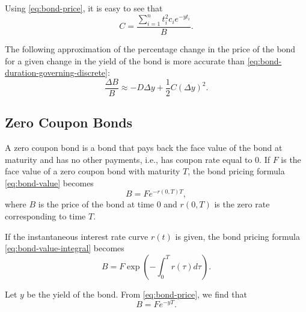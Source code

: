 Using \eqref{eq:bond-price}, it is easy to see that
\begin{equation*}
    C = \frac{\sum_{i=1}^{n} t_i^2 c_i e^{-yt_i}}{B}.
\end{equation*}

The following approximation of the percentage change in the price of the bond
    for a given change in the yield of the bond is more accurate than
    \eqref{eq:bond-duration-governing-discrete}:
\begin{equation*}
    \frac{\Delta B}{B} \approx -D \Delta y + \frac{1}{2} C (\Delta y)^2.
\end{equation*}

\subsection{Zero Coupon Bonds}
A zero coupon bond is a bond that pays back the face value of the bond at
    maturity and has no other payments, i.e., has coupon rate equal to 0.
If $ F $ is the face value of a zero coupon bond with maturity $ T $, the bond
    pricing formula \eqref{eq:bond-value} becomes
\begin{equation}
    B = F e^{-r(0, T)T},
\end{equation}
where $ B $ is the price of the bond at time 0 and $ r(0, T) $ is the zero rate
    corresponding to time $ T $.

If the instantaneous interest rate curve $ r(t) $ is given, the bond pricing
    formula \eqref{eq:bond-value-integral} becomes
\begin{equation}
    B = F \exp \left( -\int_{0}^{T} r(\tau) d\tau \right).
\end{equation}

Let $ y $ be the yield of the bond.
From \eqref{eq:bond-price}, we find that
\begin{equation}
    B = F e^{-y T}.
\end{equation}
